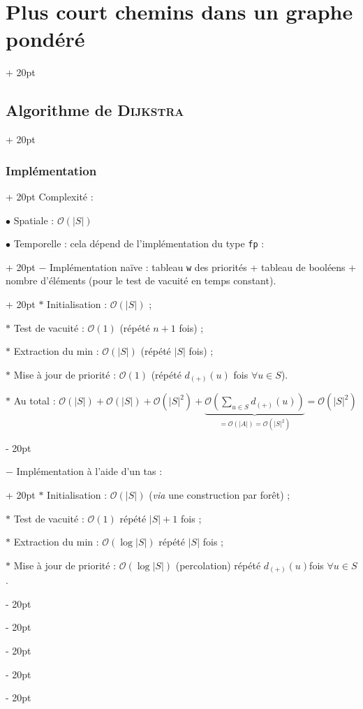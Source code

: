 \documentclass[a4paper, 12pt, twoside]{article}
\newcommand{\lr}[1]{\left( #1 \right)}
\newcommand{\abs}[1]{\left\lvert #1 \right\rvert}
\newcommand{\ind}[1][20pt]{\advance\leftskip + #1}
\newcommand{\deind}[1][20pt]{\advance\leftskip - #1}
\newenvironment{indt}[2][20pt]{#2 \par \ind[#1]}{\par \deind} %
\begin{document}
\begin{indt}{\section{Plus court chemins dans un graphe pondéré}}
\begin{indt}{\subsection{Algorithme de \textsc{Dijkstra}}}
\begin{indt}{\subsubsection{Implémentation}}
                Complexité :

                $\bullet$ Spatiale : $\mathcal O(\abs S)$

                \begin{indt}{$\bullet$ Temporelle : cela dépend de l'implémentation du type \texttt{fp} :}
                    \begin{indt}{$-$ Implémentation naïve : tableau \texttt w des priorités + tableau de booléens + nombre d'éléments (pour le test de vacuité en temps constant).}
                        $*$ Initialisation : $\mathcal O(\abs S)$ ;

                        $*$ Test de vacuité : $\mathcal O(1)$ (répété $n + 1$ fois) ;

                        $*$ Extraction du min : $\mathcal O(\abs S)$ (répété $\abs S$ fois) ;

                        $*$ Mise à jour de priorité : $\mathcal O(1)$ (répété $d_{(+)}(u)$ fois $\forall u \in S$).

                        $*$ Au total :
                        $
                            \mathcal O(\abs S)
                            + \mathcal O(\abs S)
                            + \mathcal O\!\lr{\abs S ^2}
                            + \underbrace{
                                \mathcal O\!\lr{\sum_{u \in S} d_{(+)}(u)}
                            }_{= \mathcal O(\abs A) = \mathcal O\!\lr{\abs S ^2}}
                            =
                            \mathcal O\!\lr{\abs S ^2}
                        $
                    \end{indt}

                    \vspace{12pt}
                    
                    \begin{indt}{$-$ Implémentation à l'aide d'un tas :}
                        $*$ Initialisation : $\mathcal O(\abs S)$ (\textit{via} une construction par forêt) ;

                        $*$ Test de vacuité : $\mathcal O(1)$ répété $\abs S + 1$ fois ;

                        $*$ Extraction du min : $\mathcal O(\log \abs S)$ répété $\abs S$ fois ;

                        $*$ Mise à jour de priorité : $\mathcal O(\log \abs S)$ (percolation) répété $d_{(+)}(u)$fois $\forall u \in S$.


\end{indt}
\end{indt}
\end{indt}
\end{indt}
\end{indt}
\end{document}
